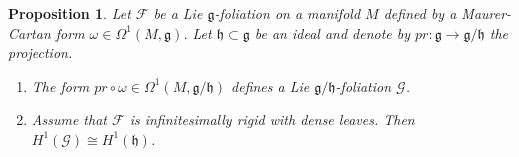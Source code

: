 \documentclass[11pt, letterpaper, oneside,reqno]{amsart}
\theoremstyle{plain}
\newtheorem{prop}[thm]{Proposition}
\theoremstyle{underline}
\theoremstyle{definition}
\theoremstyle{remark}
\begin{document}
	\begin{prop}\label{prop:spectral}
		Let $\mathcal{F}$ be a Lie $\mathfrak{g}$-foliation on a manifold $M$ defined by a Maurer-Cartan form $\omega\in\Omega^{1}(M,\mathfrak{g})$. Let $\mathfrak{h}\subset\mathfrak{g}$ be an ideal and denote by $pr:\mathfrak{g}\rightarrow \mathfrak{g}/\mathfrak{h}$ the projection. 
		\begin{enumerate}
			\item The form $pr\circ\omega\in\Omega^{1}(M,\mathfrak{g}/\mathfrak{h})$ defines a Lie $\mathfrak{g}/\mathfrak{h}$-foliation $\mathcal{G}$.
			\item Assume that $\mathcal{F}$ is infinitesimally rigid with dense leaves. Then $H^{1}(\mathcal{G})\cong H^{1}(\mathfrak{h})$.
		\end{enumerate}
	\end{prop}
\end{document}

